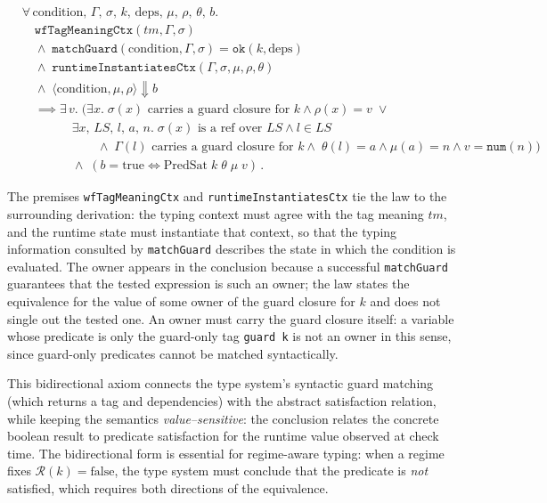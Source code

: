 \documentclass[12pt]{article}
\begin{document}
\[
\begin{aligned}
&\forall\, \text{condition},\, \Gamma,\, \sigma,\, k,\, \text{deps},\, \mu,\, \rho,\, \theta,\, b.\\
&\quad \texttt{wfTagMeaningCtx}(tm, \Gamma, \sigma)\\
&\quad \land\; \texttt{matchGuard}(\text{condition}, \Gamma, \sigma) = \texttt{ok}(k, \text{deps})\\
&\quad \land\; \texttt{runtimeInstantiatesCtx}(\Gamma, \sigma, \mu, \rho, \theta)\\
&\quad \land\; \langle \text{condition}, \mu, \rho \rangle \Downarrow b\\
&\quad \implies \exists\, v.\;
\Big(
  \exists x.\; \sigma(x)\text{ carries a guard closure for }k \land \rho(x)=v
  \;\lor\\
&\qquad\qquad
  \exists x,\, LS,\, l,\, a,\, n.\;
    \sigma(x)\text{ is a ref over }LS \land l \in LS \\
&\qquad\qquad\qquad
    \land\; \Gamma(l)\text{ carries a guard closure for }k
    \land\; \theta(l)=a \land \mu(a)=n \land v=\texttt{num}(n)
\Big)\\
&\qquad\qquad \land\; (b = \text{true} \iff \text{PredSat}\; k\; \theta\; \mu\; v)\,.
\end{aligned}
\]

The premises \texttt{wfTagMeaningCtx} and \texttt{runtimeInstantiatesCtx} tie
the law to the surrounding derivation: the typing context must agree with the
tag meaning $tm$, and the runtime state must instantiate that context, so that
the typing information consulted by \texttt{matchGuard} describes the state in
which the condition is evaluated.
The owner appears in the conclusion because a successful \texttt{matchGuard}
guarantees that the tested expression is such an owner; the law states the
equivalence for the value of some owner of the guard closure for $k$ and does
not single out the tested one.  An owner must carry the guard closure itself: a variable
whose predicate is only the guard-only tag \texttt{guard k} is not an owner in
this sense, since guard-only predicates cannot be matched syntactically.

This bidirectional axiom connects the type system's syntactic guard matching (which
returns a tag and dependencies) with the abstract satisfaction relation, while
keeping the semantics \emph{value--sensitive}: the conclusion relates the
concrete boolean result to predicate satisfaction for the runtime value observed at check time. The bidirectional form is essential for regime-aware typing: when a regime fixes $\mathcal{R}(k) = \text{false}$, the type system must conclude that the predicate is \emph{not} satisfied, which requires both directions of the equivalence.
\end{document}
